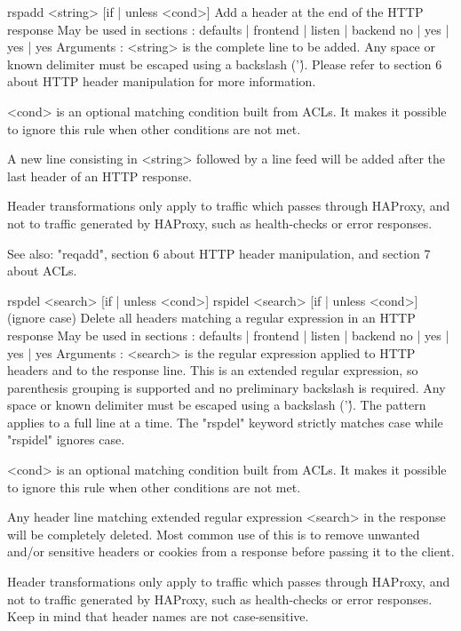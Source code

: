 rspadd <string> [{if | unless} <cond>]
  Add a header at the end of the HTTP response
  May be used in sections :   defaults | frontend | listen | backend
                                 no    |    yes   |   yes  |   yes
  Arguments :
    <string>  is the complete line to be added. Any space or known delimiter
              must be escaped using a backslash ('\'). Please refer to section
              6 about HTTP header manipulation for more information.

    <cond>    is an optional matching condition built from ACLs. It makes it
              possible to ignore this rule when other conditions are not met.

  A new line consisting in <string> followed by a line feed will be added after
  the last header of an HTTP response.

  Header transformations only apply to traffic which passes through HAProxy,
  and not to traffic generated by HAProxy, such as health-checks or error
  responses.

  See also: "reqadd", section 6 about HTTP header manipulation, and section 7
            about ACLs.


rspdel  <search> [{if | unless} <cond>]
rspidel <search> [{if | unless} <cond>]  (ignore case)
  Delete all headers matching a regular expression in an HTTP response
  May be used in sections :   defaults | frontend | listen | backend
                                 no    |    yes   |   yes  |   yes
  Arguments :
    <search>  is the regular expression applied to HTTP headers and to the
              response line. This is an extended regular expression, so
              parenthesis grouping is supported and no preliminary backslash
              is required. Any space or known delimiter must be escaped using
              a backslash ('\'). The pattern applies to a full line at a time.
              The "rspdel" keyword strictly matches case while "rspidel"
              ignores case.

    <cond>    is an optional matching condition built from ACLs. It makes it
              possible to ignore this rule when other conditions are not met.

  Any header line matching extended regular expression <search> in the response
  will be completely deleted. Most common use of this is to remove unwanted
  and/or sensitive headers or cookies from a response before passing it to the
  client.

  Header transformations only apply to traffic which passes through HAProxy,
  and not to traffic generated by HAProxy, such as health-checks or error
  responses. Keep in mind that header names are not case-sensitive.

